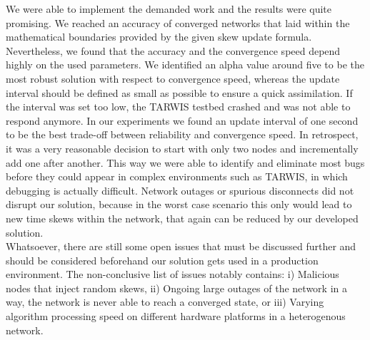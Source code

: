\documentclass{llncs}
\begin{document}
We were able to implement the demanded work and the results were quite promising. We reached an accuracy of converged networks that laid within the mathematical boundaries provided by the given skew update formula. Nevertheless, we found that the accuracy and the convergence speed depend highly on the used parameters. We identified an alpha value around five to be the most robust solution with respect to convergence speed, whereas the update interval should be defined as small as possible to ensure a quick assimilation. If the interval was set too low, the TARWIS testbed crashed and was not able to respond anymore. In our experiments we found an update interval of one second to be the best trade-off between reliability and convergence speed. In retrospect, it was a very reasonable decision to start with only two nodes and incrementally add one after another. This way we were able to identify and eliminate most bugs before they could appear in complex environments such as TARWIS, in which debugging is actually difficult. Network outages or spurious disconnects did not disrupt our solution, because in the worst case scenario this only would lead to new time skews within the network, that again can be reduced by our developed solution.\\
\indent Whatsoever, there are still some open issues that must be discussed further and should be considered beforehand our solution gets used in a production environment. The non-conclusive list of issues notably contains: i) Malicious nodes that inject random skews, ii) Ongoing large outages of the network in a way, the network is never able to reach a converged state, or iii) Varying algorithm processing speed on different hardware platforms in a heterogenous network.

{}



%
%
\end{document}
